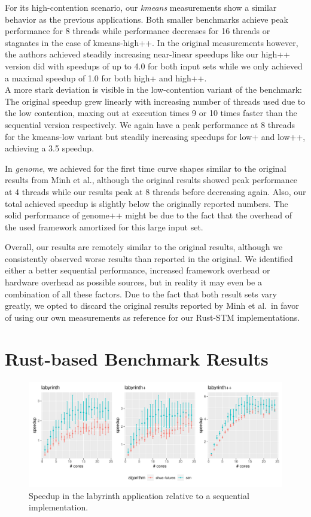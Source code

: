 For its high-contention scenario, our \emph{kmeans} measurements show a similar behavior as the previous applications.
Both smaller benchmarks achieve peak performance for 8 threads while performance decreases for 16 threads or stagnates in the case of kmeans-high++.
In the original measurements however, the authors achieved steadily increasing near-linear speedups like our high++ version did with speedups of up to 4.0 for both input sets while we only achieved a maximal speedup of 1.0 for both high+ and high++.\\
A more stark deviation is visible in the low-contention variant of the benchmark:
The original speedup grew linearly with increasing number of threads used due to the low contention, maxing out at execution times 9 or 10 times faster than the sequential version respectively.
We again have a peak performance at 8 threads for the kmeans-low variant but steadily increasing speedups for low+ and low++, achieving a 3.5 speedup.

In \emph{genome}, we achieved for the first time curve shapes similar to the original results from Minh et al., although the original results showed peak performance at 4 threads while our results peak at 8 threads before decreasing again.
Also, our total achieved speedup is slightly below the originally reported numbers.
The solid performance of genome++ might be due to the fact that the overhead of the used framework amortized for this large input set.

Overall, our results are remotely similar to the original results, although we consistently observed worse results than reported in the original.
We identified either a better sequential performance, increased framework overhead or hardware overhead as possible sources, but in reality it may even be a combination of all these factors.
Due to the fact that both result sets vary greatly, we opted to discard the original results reported by Minh et al.\ in favor of using our own measurements as reference for our Rust-STM implementations.


\section{Rust-based Benchmark Results}%
\label{sec:evaluation:benchmarks}

\begin{figure}
    \centering
    \includegraphics[width=\textwidth,keepaspectratio]{gfx/results/labyrinth_comb}
    \caption{Speedup in the labyrinth application relative to a sequential implementation.}%
    \label{fig:evaluation:labyrinth}
\end{figure}

